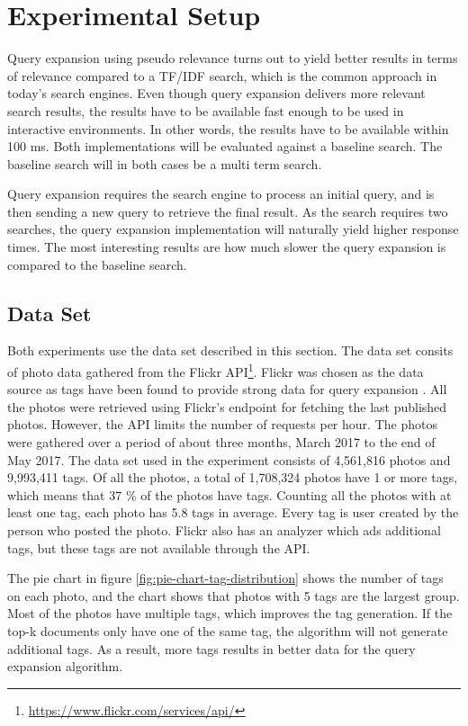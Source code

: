 \section{Experimental Setup}
Query expansion using pseudo relevance turns out to yield better results in terms of relevance compared to a TF/IDF search,
which is the common approach in today's search engines.
Even though query expansion delivers more relevant search results,
the results have to be available fast enough to be used in interactive environments.
In other words, the results have to be available within 100 ms.
Both implementations will be evaluated against a baseline search.
The baseline search will in both cases be a multi term search.

Query expansion requires the search engine to process an initial query,
and is then sending a new query to retrieve the final result.
As the search requires two searches,
the query expansion implementation will naturally yield higher response times.
The most interesting results are how much slower the query expansion is compared to the baseline search.

\subsection{Data Set}
\label{sec:dataset}
Both experiments use the data set described in this section.
The data set consits of photo data gathered from the Flickr API\footnote{\url{https://www.flickr.com/services/api/}}.
Flickr was chosen as the data source as tags have been found to provide strong data for query expansion \cite{ir-hashtag}.
All the photos were retrieved using Flickr's endpoint for fetching the last published photos.
However, the API limits the number of requests per hour.
The photos were gathered over a period of about three months, March 2017 to the end of May 2017.
The data set used in the experiment consists of 4,561,816 photos and 9,993,411 tags.
Of all the photos, a total of 1,708,324 photos have 1 or more tags,
which means that 37 \% of the photos have tags.
Counting all the photos with at least one tag,
each photo has 5.8 tags in average.
Every tag is user created by the person who posted the photo.
Flickr also has an analyzer which ads additional tags,
but these tags are not available through the API.

The pie chart in figure \ref{fig:pie-chart-tag-distribution} shows the number of tags on each photo,
and the chart shows that photos with 5 tags are the largest group.
Most of the photos have multiple tags,
which improves the tag generation.
If the top-k documents only have one of the same tag,
the algorithm will not generate additional tags.
As a result, more tags results in better data for the query expansion algorithm.

